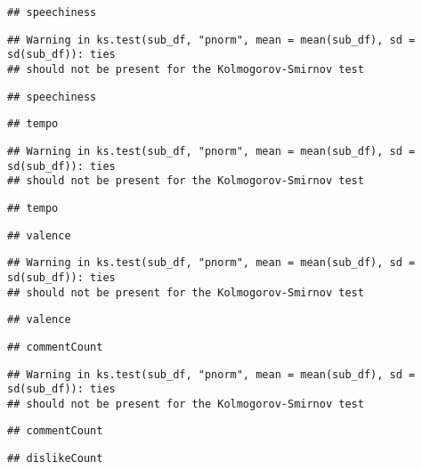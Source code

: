 \documentclass[
]{article}
\begin{document}
\begin{verbatim}
## speechiness
\end{verbatim}

\begin{verbatim}
## Warning in ks.test(sub_df, "pnorm", mean = mean(sub_df), sd = sd(sub_df)): ties
## should not be present for the Kolmogorov-Smirnov test
\end{verbatim}

\begin{verbatim}
## speechiness
\end{verbatim}

\begin{verbatim}
## tempo
\end{verbatim}

\begin{verbatim}
## Warning in ks.test(sub_df, "pnorm", mean = mean(sub_df), sd = sd(sub_df)): ties
## should not be present for the Kolmogorov-Smirnov test
\end{verbatim}

\begin{verbatim}
## tempo
\end{verbatim}

\begin{verbatim}
## valence
\end{verbatim}

\begin{verbatim}
## Warning in ks.test(sub_df, "pnorm", mean = mean(sub_df), sd = sd(sub_df)): ties
## should not be present for the Kolmogorov-Smirnov test
\end{verbatim}

\begin{verbatim}
## valence
\end{verbatim}

\begin{verbatim}
## commentCount
\end{verbatim}

\begin{verbatim}
## Warning in ks.test(sub_df, "pnorm", mean = mean(sub_df), sd = sd(sub_df)): ties
## should not be present for the Kolmogorov-Smirnov test
\end{verbatim}

\begin{verbatim}
## commentCount
\end{verbatim}

\begin{verbatim}
## dislikeCount
\end{verbatim}
\end{document}
